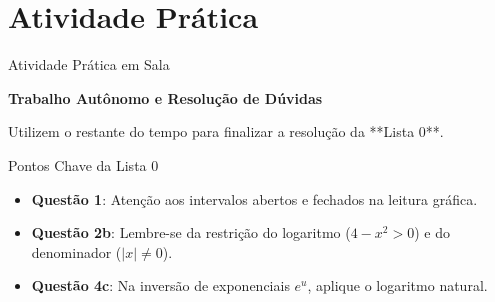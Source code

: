 \documentclass[10pt, aspectratio=169]{beamer}
\begin{document}
\section{Atividade Prática}

\begin{frame}{Atividade Prática em Sala}
    \transblindshorizontal
    \begin{center}
        \Large \textbf{Trabalho Autônomo e Resolução de Dúvidas}
        \vspace{0.5cm}

        \small
        Utilizem o restante do tempo para finalizar a resolução da **Lista 0**.

        \pause
        \vspace{0.3cm}
        \begin{block}{Pontos Chave da Lista 0}
            \begin{itemize}
                \item \textbf{Questão 1}: Atenção aos intervalos abertos e fechados na leitura gráfica.
                \pause
                \item \textbf{Questão 2b}: Lembre-se da restrição do logaritmo ($4-x^2 > 0$) e do denominador ($|x| \neq 0$).
                \pause
                \item \textbf{Questão 4c}: Na inversão de exponenciais $e^{u}$, aplique o logaritmo natural.
            \end{itemize}
        \end{block}
    \end{center}
\end{frame}
\end{document}
